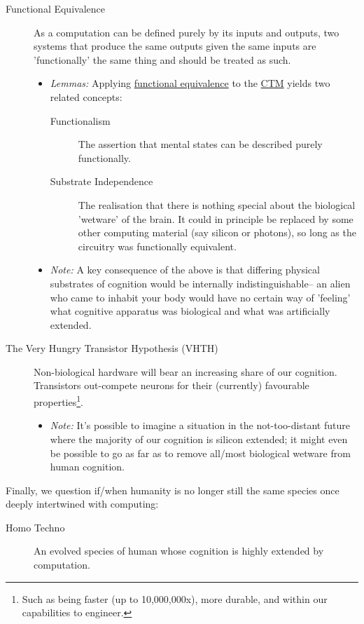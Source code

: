 \documentclass[logo,bsc,singlespacing,parskip]{infthesis}
\begin{document}
{\begin{mdframed}
\begin{description}
\item[{\label{org1ce07fc}Functional Equivalence}] As a computation can be defined purely by its inputs and outputs, two systems that produce the same outputs given the same inputs are 'functionally' the same thing and should be treated as such.
\begin{itemize}
\item \emph{Lemmas:} Applying \hyperref[org1ce07fc]{functional equivalence} to the \hyperref[org204d6ba]{CTM} yields two related concepts:
\begin{description}
\item[{Functionalism}] The assertion that mental states can be described purely functionally.
\item[{Substrate Independence}] The realisation that there is nothing special about the biological 'wetware' of the brain.
It could in principle be replaced by some other computing material (say silicon or photons), so long as the circuitry was functionally equivalent.
\end{description}
\item \emph{Note:} A key consequence of the above is that differing physical substrates of cognition would be internally indistinguishable-- an alien who came to inhabit your body would have no certain way of 'feeling' what cognitive apparatus was biological and what was artificially extended.
\end{itemize}
\end{description}
\end{mdframed}

\begin{mdframed}
\begin{description}
\item[{The Very Hungry Transistor Hypothesis (VHTH)}] Non-biological hardware will bear an increasing share of our cognition.
Transistors out-compete neurons for their (currently) favourable properties\footnote{Such as being faster (up to 10,000,000x), more durable, and within our capabilities to engineer.}.
\begin{itemize}
\item \emph{Note:} It's possible to imagine a situation in the not-too-distant future where the majority of our cognition is silicon extended; it might even be possible to go as far as to remove all/most biological wetware from human cognition.
\end{itemize}
\end{description}
\end{mdframed}

Finally, we question if/when humanity is no longer still the same species once deeply intertwined with computing:

\begin{mdframed}
\begin{description}
\item[{Homo Techno}] An evolved species of human whose cognition is highly extended by computation.
\end{description}
\end{mdframed}
}
\end{document}
